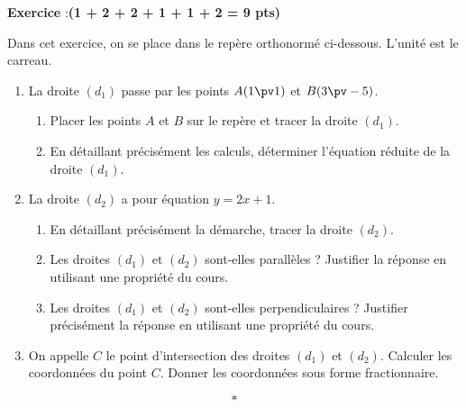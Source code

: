 \documentclass[11pt,french]{book}
\newcounter{exoc}
\newenvironment{exoc}[1]{%
  \refstepcounter{exoc}\textbf{Exercice \theexoc} :\hfill {\textbf{(#1)}}\par
  \medskip}%
{\medskip}
\begin{document}
\begin{exoc}{1 + 2 + 2 + 1 + 1 + 2 = 9 pts}
Dans cet exercice, on se place dans le repère orthonormé \OIJ ci-dessous. L'unité est le carreau.\medskip

\begin{minipage}{0.65\linewidth}
    \begin{enumerate}
        \item La droite $(d_1)$ passe par les points $A(1 \pv 1)$ et $B(3 \pv -5)$.
            \begin{enumerate}
                \item Placer les points $A$ et $B$ sur le repère et tracer la droite $(d_1)$.
                \item En détaillant précisément les calculs, déterminer l'équation réduite de la droite $(d_1)$.
            \end{enumerate}
        \item La droite $(d_2)$ a pour équation $y = 2x + 1$.
            \begin{enumerate}
                \item En détaillant précisément la démarche, tracer la droite $(d_2)$.
                \item Les droites $(d_1)$ et $(d_2)$ sont-elles parallèles ? Justifier la réponse en utilisant une propriété du cours.
                \item Les droites $(d_1)$ et $(d_2)$ sont-elles perpendiculaires ? Justifier précisément la réponse en utilisant une propriété du cours.
            \end{enumerate}
        \item On appelle $C$ le point d'intersection des droites $(d_1)$ et $(d_2)$. Calculer les coordonnées du point $C$. Donner les coordonnées sous forme fractionnaire.
    \end{enumerate}
\end{minipage}
\begin{minipage}{0.33\linewidth}
\begin{center}
\end{center}
\end{minipage}
\end{exoc}\[*\]
\end{document}
